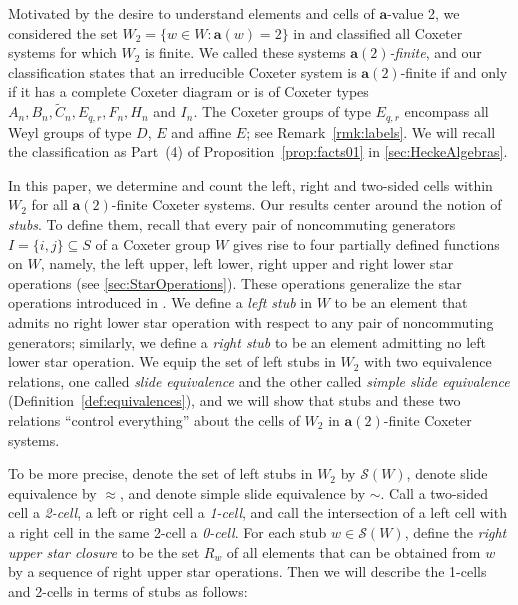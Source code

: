 \documentclass[ALCO,Unicode,published]{cedram}
\newcommand{\la}{\mathbf{a}}
\newcommand{\sw}{\mathcal{S}(W)}
\newcommand{\se}{\subseteq}
\begin{document}
Motivated by the desire to understand elements and cells of  $\la$-value 2, we considered the set
$W_2=\{w\in W:\la(w)=2\}$ in \cite{GreenXu} and classified all Coxeter systems for which $W_2$ is
finite. We called these systems \emph{$\la(2)$-finite}, and our classification states that an
irreducible Coxeter system is $\la(2)$-finite if and only if it has a complete Coxeter diagram or is
of Coxeter types $A_n, B_n, \tilde C_n, E_{q,r}, F_n, H_n$ and $I_n$. The Coxeter groups of type
$E_{q,r}$ encompass all Weyl groups of type $D$, $E$ and affine $E$; see Remark~\ref{rmk:labels}. We will
recall the classification as Part~(4) of Proposition~\ref{prop:facts01} in \autoref{sec:HeckeAlgebras}.

In this paper, we determine and count the left, right and two-sided cells within $W_2$ for all
$\la(2)$-finite Coxeter systems.  Our results center around the notion of \emph{stubs}. To define
them, recall that every pair of noncommuting generators $I=\{i,j\}\se S$ of a Coxeter group $W$
gives rise to four partially defined functions on $W$, namely, the left upper, left lower, right
upper and right lower star operations (see \autoref{sec:StarOperations}). These operations
generalize the star operations introduced in \cite{KL}. We define a \emph{left stub} in $W$ to be an
element that admits no right lower star operation with respect to any pair of noncommuting
generators; similarly, we define a \emph{right stub} to be an element admitting no left lower star
operation. We equip the set of left stubs in $W_2$ with two equivalence relations, one called
\emph{slide equivalence} and the other called \emph{simple slide equivalence}
(Definition~\ref{def:equivalences}), and we will show that stubs and these two relations ``control
everything'' about the cells of $W_2$ in $\la(2)$-finite Coxeter systems. 

To be more precise, denote the set of left stubs in $W_2$ by $\sw$, denote slide equivalence by
$\approx$, and denote simple slide equivalence by $\sim$.  Call a two-sided cell a \emph{2-cell}, a
left or right cell a \emph{1-cell}, and call the intersection of a left cell with a right cell in
the same 2-cell a \emph{0-cell}. For each stub $w\in \sw$, define the \emph{right upper star
closure} to be the set $R_w$ of all elements that can be obtained from $w$ by a sequence of right
upper star operations.  Then we will describe the 1-cells and 2-cells in terms of stubs as follows:
\end{document}
